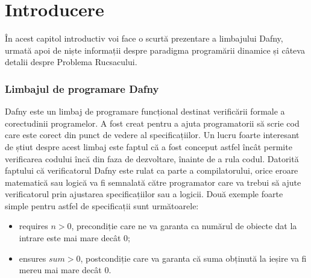 
\chapter*{Introducere} 

În acest capitol introductiv voi face o scurtă prezentare a limbajului Dafny, urmată apoi de niște informații despre paradigma programării dinamice și câteva detalii despre Problema Rucsacului.

\subsection*{Limbajul de programare Dafny}
Dafny este un limbaj de programare funcțional destinat verificării formale a corectudinii programelor. A fost creat pentru a ajuta programatorii să scrie cod care este corect din punct de vedere al specificațiilor. Un lucru foarte interesant de știut despre acest limbaj este faptul că a fost conceput astfel încât permite verificarea codului încă din faza de dezvoltare, înainte de a rula codul. Datorită faptului că verificatorul Dafny este rulat ca parte a compilatorului, orice eroare matematică sau logică va fi semnalată către programator care va trebui să ajute verificatorul prin ajustarea specificațiilor sau a logicii. Două exemple foarte simple pentru astfel de specificații sunt următoarele:
\begin{itemize}
    \item requires \( n > 0 \), precondiție care ne va garanta ca numărul de obiecte dat la intrare este mai mare decât 0;
    \item ensures \(sum >  0\), postcondiție care va garanta că suma obținută la ieșire va fi mereu mai mare decât 0.
\end{itemize}

